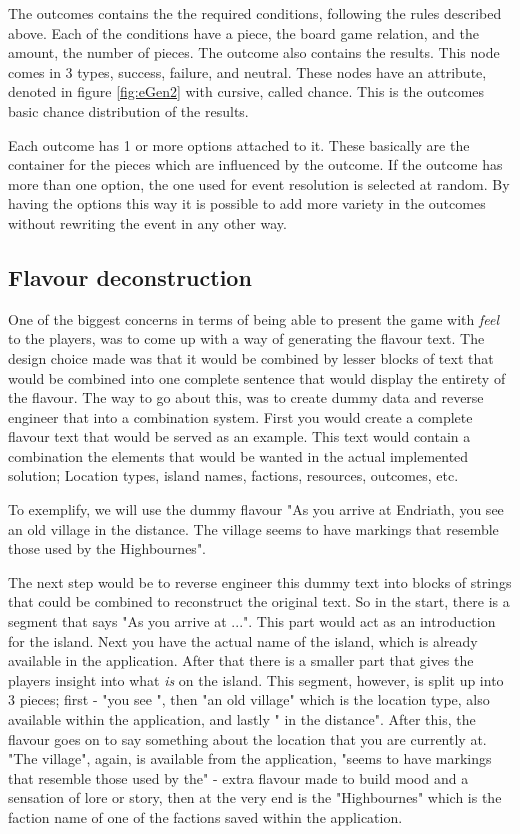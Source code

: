 The outcomes contains the the required conditions, following the rules described above. Each of the conditions have a piece, the board game relation, and the amount, the number of pieces. 
The outcome also contains the results. This node comes in 3 types, success, failure, and neutral. These nodes have an attribute, denoted in figure \ref{fig:eGen2} with cursive, called chance. This is the outcomes basic chance distribution of the results. 

Each outcome has 1 or more options attached to it. These basically are the container for the pieces which are influenced by the outcome. If the outcome has more than one option, the one used for event resolution is selected at random. 
By having the options this way it is possible to add more variety in the outcomes without rewriting the event in any other way.
\subsection{Flavour deconstruction}
One of the biggest concerns in terms of being able to present the game with \textit{feel} to the players, was to come up with a way of generating the flavour text. The design choice made was that it would be combined by lesser blocks of text that would be combined into one complete sentence that would display the entirety of the flavour. The way to go about this, was to create dummy data and reverse engineer that into a combination system. First you would create a complete flavour text that would be served as an example. This text would contain a combination the elements that would be wanted in the actual implemented solution; Location types, island names, factions, resources, outcomes, etc.

To exemplify, we will use the dummy flavour "As you arrive at Endriath, you see an old village in the distance. The village seems to have markings that resemble those used by the Highbournes".

The next step would be to reverse engineer this dummy text into blocks of strings that could be combined to reconstruct the original text. So in the start, there is a segment that says "As you arrive at ...". This part would act as an introduction for the island. Next you have the actual name of the island, which is already available in the application. After that there is a smaller part that gives the players insight into what \textit{is} on the island. This segment, however, is split up into 3 pieces; first - "you see ", then "an old village" which is the location type, also available within the application, and lastly " in the distance". After this, the flavour goes on to say something about the location that you are currently at. "The village", again, is available from the application, "seems to have markings that resemble those used by the" - extra flavour made to build mood and a sensation of lore or story, then at the very end is the "Highbournes" which is the faction name of one of the factions saved within the application.

